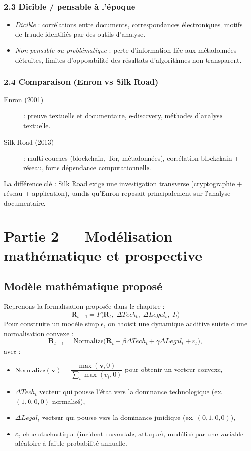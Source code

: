 \documentclass[12pt,a4paper]{article}
\begin{document}
\subsubsection{2.3 Dicible / pensable à l'époque}
\begin{itemize}
  \item \emph{Dicible} : corrélations entre documents, correspondances électroniques, motifs de fraude identifiés par des outils d'analyse.
  \item \emph{Non-pensable ou problématique} : perte d'information liée aux métadonnées détruites, limites d'opposabilité des résultats d'algorithmes non-transparent.
\end{itemize}

\subsubsection{2.4 Comparaison (Enron vs Silk Road)}
\begin{description}
  \item[Enron (2001)] : preuve textuelle et documentaire, e-discovery, méthodes d'analyse textuelle.
  \item[Silk Road (2013)] : multi-couches (blockchain, Tor, métadonnées), corrélation blockchain + réseau, forte dépendance computationnelle.
\end{description}
La différence clé : Silk Road exige une investigation transverse (cryptographie + réseau + application), tandis qu'Enron reposait principalement sur l'analyse documentaire.

\clearpage
\section{Partie 2 — Modélisation mathématique et prospective}

\subsection{ Modèle mathématique proposé}
Reprenons la formalisation proposée dans le chapitre :
\[
\mathbf{R}_{t+1} = F\big(\mathbf{R}_t,\; \Delta Tech_t,\; \Delta Legal_t,\; I_t\big)
\]
Pour construire un modèle simple, on choisit une dynamique additive suivie d'une normalisation convexe :
\[
\mathbf{R}_{t+1} = \mathrm{Normalize}\Big(\mathbf{R}_t + \beta \Delta Tech_t + \gamma \Delta Legal_t + \varepsilon_t \Big),
\]
avec :
\begin{itemize}
  \item $\mathrm{Normalize}(\mathbf{v}) = \dfrac{\max(\mathbf{v},0)}{\sum_i \max(v_i,0)}$ pour obtenir un vecteur convexe,
  \item $\Delta Tech_t$ vecteur qui pousse l'état vers la dominance technologique (ex. $(1,0,0,0)$ normalisé),
  \item $\Delta Legal_t$ vecteur qui pousse vers la dominance juridique (ex. $(0,1,0,0)$),
  \item $\varepsilon_t$ choc stochastique (incident : scandale, attaque), modélisé par une variable aléatoire à faible probabilité annuelle.
\end{itemize}
\end{document}
